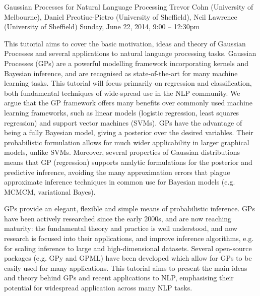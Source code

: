 \begin{tutorial}{Gaussian Processes for Natural Language Processing}
  {Trevor Cohn (University of Melbourne), Daniel Preotiuc-Pietro (University of Sheffield), Neil Lawrence (University of Sheffield)}
  {Sunday, June 22, 2014, 9:00 -- 12:30pm}
  {\TutLocA}

This tutorial aims to cover the basic motivation, ideas and theory of Gaussian Processes and several applications to natural language processing tasks. Gaussian Processes (GPs) are a powerful modelling framework incorporating kernels and Bayesian inference, and are recognised as state-of-the-art for many machine learning tasks. This tutorial will focus primarily on regression and classification, both fundamental techniques of wide-spread use in the NLP community. We argue that the GP framework offers many benefits over commonly used machine learning frameworks, such as linear models (logistic regression, least squares regression) and support vector machines (SVMs). GPs have the advantage of being a fully Bayesian model, giving a posterior over the desired variables. Their probabilistic formulation allows for much wider applicability in larger graphical models, unlike SVMs. Moreover, several properties of Gaussian distributions means that GP (regression) supports analytic formulations for the posterior and predictive inference, avoiding the many approximation errors that plague approximate inference techniques in common use for Bayesian models (e.g. MCMCM, variational Bayes).

GPs provide an elegant, flexible and simple means of probabilistic inference. GPs have been actively researched since the early 2000s, and are now reaching maturity: the fundamental theory and practice is well understood, and now research is focused into their applications, and improve inference algorithms, e.g. for scaling inference to large and high-dimensional datasets. Several open-source packages (e.g. GPy and GPML) have been developed which allow for GPs to be easily used for many applications. This tutorial aims to present the main ideas and theory behind GPs and recent applications to NLP, emphasising their potential for widespread application across many NLP tasks.
\end{tutorial}
